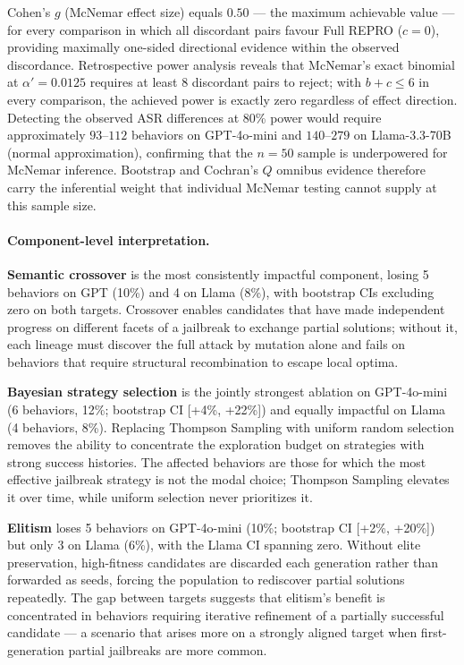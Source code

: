 Cohen's $g$ (McNemar effect size) equals $0.50$ — the maximum achievable
value — for every comparison in which all discordant pairs favour Full
REPRO ($c{=}0$), providing maximally one-sided directional evidence within
the observed discordance.
Retrospective power analysis reveals that McNemar's exact binomial at
$\alpha'{=}0.0125$ requires at least $8$ discordant pairs to reject;
with $b{+}c \leq 6$ in every comparison, the achieved power is exactly
zero regardless of effect direction.
Detecting the observed ASR differences at $80$\% power would require
approximately $93$--$112$ behaviors on GPT-4o-mini and $140$--$279$ on
Llama-3.3-70B (normal approximation), confirming that the $n{=}50$ sample
is underpowered for McNemar inference.
Bootstrap and Cochran's $Q$ omnibus evidence therefore carry the
inferential weight that individual McNemar testing cannot supply at
this sample size.

\paragraph{Component-level interpretation.}

\textbf{Semantic crossover} is the most consistently impactful component,
losing 5 behaviors on GPT (10\%) and 4 on Llama (8\%), with bootstrap CIs
excluding zero on both targets.
Crossover enables candidates that have made independent progress on
different facets of a jailbreak to exchange partial solutions; without it,
each lineage must discover the full attack by mutation alone and fails on
behaviors that require structural recombination to escape local optima.

\textbf{Bayesian strategy selection} is the jointly strongest ablation on
GPT-4o-mini (6 behaviors, 12\%; bootstrap CI [+4\%, +22\%]) and equally
impactful on Llama (4 behaviors, 8\%).
Replacing Thompson Sampling with uniform random selection removes the
ability to concentrate the exploration budget on strategies with strong
success histories.
The affected behaviors are those for which the most effective jailbreak
strategy is not the modal choice; Thompson Sampling elevates it over time,
while uniform selection never prioritizes it.

\textbf{Elitism} loses 5 behaviors on GPT-4o-mini (10\%; bootstrap CI
[+2\%, +20\%]) but only 3 on Llama (6\%), with the Llama CI spanning zero.
Without elite preservation, high-fitness candidates are discarded each
generation rather than forwarded as seeds, forcing the population to
rediscover partial solutions repeatedly.
The gap between targets suggests that elitism's benefit is
concentrated in behaviors requiring iterative refinement of a partially
successful candidate — a scenario that arises more on a strongly aligned
target when first-generation partial jailbreaks are more common.

